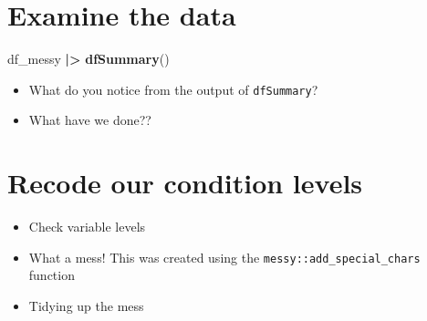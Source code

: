 \documentclass[
]{article}
\newenvironment{Shaded}{\begin{snugshade}}{\end{snugshade}}
\newcommand{\AttributeTok}[1]{\textcolor[rgb]{0.13,0.29,0.53}{#1}}
\newcommand{\CommentTok}[1]{\textcolor[rgb]{0.56,0.35,0.01}{\textit{#1}}}
\newcommand{\FunctionTok}[1]{\textcolor[rgb]{0.13,0.29,0.53}{\textbf{#1}}}
\newcommand{\NormalTok}[1]{#1}
\newcommand{\OtherTok}[1]{\textcolor[rgb]{0.56,0.35,0.01}{#1}}
\newcommand{\SpecialCharTok}[1]{\textcolor[rgb]{0.81,0.36,0.00}{\textbf{#1}}}
\newcommand{\StringTok}[1]{\textcolor[rgb]{0.31,0.60,0.02}{#1}}
\providecommand{\tightlist}{%
  \setlength{\itemsep}{0pt}\setlength{\parskip}{0pt}}
\begin{document}
\hypertarget{examine-the-data}{%
\section{Examine the data}\label{examine-the-data}}

\begin{Shaded}
\begin{Highlighting}[]
\NormalTok{df\_messy }\SpecialCharTok{|\textgreater{}}
  \FunctionTok{dfSummary}\NormalTok{()}
\end{Highlighting}
\end{Shaded}

\begin{itemize}
\tightlist
\item
  What do you notice from the output of \texttt{dfSummary}?
\item
  What have we done??
\end{itemize}

\hypertarget{recode-our-condition-levels}{%
\section{Recode our condition
levels}\label{recode-our-condition-levels}}

\begin{itemize}
\tightlist
\item
  Check variable levels
\end{itemize}

\begin{Shaded}
\end{Shaded}

\begin{itemize}
\item
  What a mess! This was created using the
  \texttt{messy::add\_special\_chars} function
\item
  Tidying up the mess
\end{itemize}

\begin{Shaded}
\end{Shaded}
\end{document}
